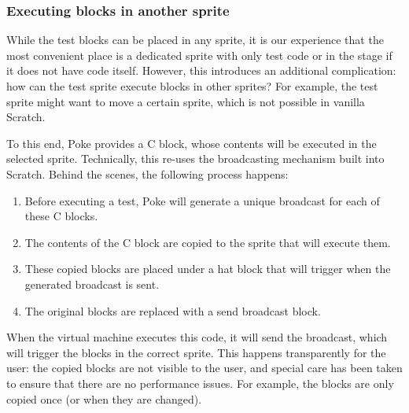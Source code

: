 \documentclass[../main]{subfiles}
\begin{document}
\subsubsection{Executing blocks in another sprite}

\begin{varwidth}{0.5\linewidth}
    \begin{scratch}[scale=0.6]
    \end{scratch}
\end{varwidth}%
\hspace{1em}%
\begin{varwidth}{0.5\linewidth}
    \begin{scratch}[scale=0.6]
    \end{scratch}
\end{varwidth}%

While the test blocks can be placed in any sprite, it is our experience that the most convenient place is a dedicated sprite with only test code or in the stage if it does not have code itself.
However, this introduces an additional complication: how can the test sprite execute blocks in other sprites?
For example, the test sprite might want to move a certain sprite, which is not possible in vanilla Scratch.

To this end, Poke provides a C block, whose contents will be executed in the selected sprite.
Technically, this re-uses the broadcasting mechanism built into Scratch.
Behind the scenes, the following process happens:

\begin{enumerate}
    \item Before executing a test, Poke will generate a unique broadcast for each of these C blocks.
    \item The contents of the C block are copied to the sprite that will execute them.
    \item These copied blocks are placed under a hat block that will trigger when the generated broadcast is sent.
    \item The original blocks are replaced with a send broadcast block.
\end{enumerate}

When the virtual machine executes this code, it will send the broadcast, which will trigger the blocks in the correct sprite.
This happens transparently for the user: the copied blocks are not visible to the user, and special care has been taken to ensure that there are no performance issues.
For example, the blocks are only copied once (or when they are changed).
\end{document}
